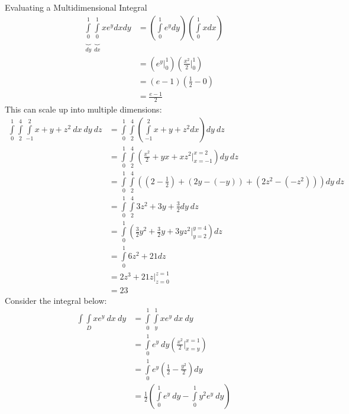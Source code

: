 \documentclass[8pt]{extarticle}
\begin{document}
  \begin{problem}{Evaluating a Multidimensional Integral}
    \begin{align*}
      \underbrace{\int\limits_{0}^{1}}_{dy}\underbrace{\int\limits_{0}^{1}}_{dx}xe^y dx dy &= \left(\int\limits_{0}^{1}e^y dy\right)\left(\int\limits_{0}^{1}x dx\right)\\
                                                                             &= \left(e^y\biggr\vert_{0}^{1}\right)\left(\frac{x^2}{2}\biggr\vert_{0}^{1}\right)\\
                                                                             &= (e-1)\left(\frac{1}{2}-0\right)\\
                                                                             &= \frac{e-1}{2}
    \end{align*}
    This can scale up into multiple dimensions:
    \begin{align*}
      \int\limits_{0}^{1}\int\limits_{2}^{4}\int\limits_{-1}^{2} x+y+z^2~dx~dy~dz &= \int\limits_{0}^{1}\int\limits_{2}^{4}\left(\int\limits_{-1}^{2}x+y+z^2 dx\right)dy~dz\\
                                                             &= \int\limits_{0}^{1}\int\limits_{2}^{4}\left(\frac{x^2}{2}+yx + xz^2 \biggr\vert_{x=-1}^{x=2}\right)dy~dz\\
                                                             &= \int\limits_{0}^{1}\int\limits_{2}^{4}\left(\left(2-\frac{1}{2}\right) + (2y-(-y)) + (2z^2-(-z^2))\right) dy~dz\\
                                                             &= \int\limits_{0}^{1}\int\limits_{2}^{4} 3z^2 + 3y + \frac{3}{2} dy~dz\\
                                                             &= \int\limits_{0}^{1} \left(\frac{3}{2}y^2 + \frac{3}{2}y + 3yz^2\biggr\vert_{y=2}^{y=4}\right)dz\\
                                                             &= \int\limits_{0}^{1} 6z^2+21 dz\\
                                                             &= 2z^3 + 21z\biggr\vert_{z=0}^{z=1} \\
                                                             &= 23
    \end{align*}
    Consider the integral below:
    \begin{align*}
      \int\int\limits_{D}xe^y~dx~dy &= \int\limits_{0}^{1}\int\limits_{y}^{1}xe^y~dx~dy\\
                                    &= \int\limits_{0}^{1}e^y~dy\left(\frac{x^2}{2}\biggr\vert_{x=y}^{x=1}\right)\\
                                    &= \int\limits_{0}^{1}e^y\left(\frac{1}{2} - \frac{y^2}{2}\right)dy\\
                                    &= \frac{1}{2}\left(\int\limits_{0}^{1}e^y~dy - \int\limits_{0}^{1}y^2e^y~dy\right)
    \end{align*}
  \end{problem}
\end{document}
